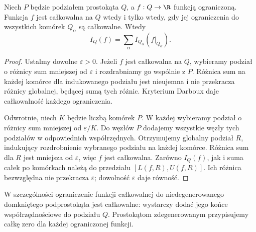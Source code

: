 \begin{twierdzenie}
\label{ma2:thm:riemann-box-additivity}
Niech $P$ będzie podziałem prostokąta $Q$, a $f:Q\to\R$
funkcją ograniczoną. Funkcja $f$ jest całkowalna na $Q$
wtedy i tylko wtedy, gdy jej ograniczenia do wszystkich
komórek $Q_\alpha$ są całkowalne. Wtedy
\[
 I_Q(f)=\sum_\alpha I_{Q_\alpha}(f|_{Q_\alpha}).
\]
\end{twierdzenie}
\begin{proof}
Ustalmy dowolne $\varepsilon>0$. Jeżeli $f$ jest
całkowalna na $Q$, wybieramy podział
o różnicy sum mniejszej od $\varepsilon$ i rozdrabniamy
go wspólnie z $P$. Różnica sum na każdej komórce
dla indukowanego podziału jest nieujemna i nie przekracza
różnicy globalnej, będącej sumą tych różnic.
Kryterium Darboux daje całkowalność każdego ograniczenia.

Odwrotnie, niech $K$ będzie liczbą komórek $P$.
W każdej wybieramy podział o różnicy sum mniejszej
od $\varepsilon/K$. Do węzłów $P$ dodajemy wszystkie
węzły tych podziałów w odpowiednich współrzędnych.
Otrzymujemy globalny podział $R$, indukujący
rozdrobnienie wybranego podziału na każdej komórce.
Różnica sum dla $R$ jest mniejsza od $\varepsilon$,
więc $f$ jest całkowalna.
Zarówno $I_Q(f)$, jak i suma całek po komórkach
należą do przedziału $[L(f,R),U(f,R)]$.
Ich różnica bezwzględna nie przekracza $\varepsilon$;
dowolność $\varepsilon$ daje równość.
\end{proof}

W szczególności ograniczenie funkcji całkowalnej
do niedegenerowanego domkniętego podprostokąta
jest całkowalne: wystarczy dodać jego końce
współrzędnościowe do podziału $Q$. Prostokątom
zdegenerowanym przypisujemy całkę zero dla każdej
ograniczonej funkcji.

